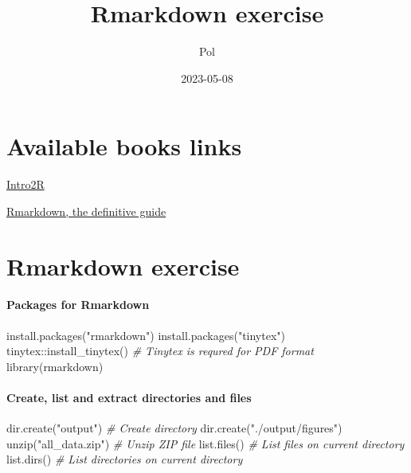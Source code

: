 \documentclass[
]{article}
\title{Rmarkdown exercise}
\author{Pol}
\date{2023-05-08}
\newenvironment{Shaded}{\begin{snugshade}}{\end{snugshade}}
\newcommand{\CommentTok}[1]{\textcolor[rgb]{0.56,0.35,0.01}{\textit{#1}}}
\newcommand{\FunctionTok}[1]{\textcolor[rgb]{0.00,0.00,0.00}{#1}}
\newcommand{\NormalTok}[1]{#1}
\newcommand{\SpecialCharTok}[1]{\textcolor[rgb]{0.00,0.00,0.00}{#1}}
\newcommand{\StringTok}[1]{\textcolor[rgb]{0.31,0.60,0.02}{#1}}
\begin{document}
\maketitle

\hypertarget{available-books-links}{%
\section{Available books links}\label{available-books-links}}

\href{intro2r.com}{Intro2R}

\href{https://bookdown.org/yihui/rmarkdown/}{Rmarkdown, the definitive
guide}

\hypertarget{rmarkdown-exercise}{%
\section{Rmarkdown exercise}\label{rmarkdown-exercise}}

\hypertarget{packages-for-rmarkdown}{%
\paragraph{Packages for Rmarkdown}\label{packages-for-rmarkdown}}

\begin{Shaded}
\begin{Highlighting}[]
\FunctionTok{install.packages}\NormalTok{(}\StringTok{"rmarkdown"}\NormalTok{)}
\FunctionTok{install.packages}\NormalTok{(}\StringTok{"tinytex"}\NormalTok{)}
\NormalTok{tinytex}\SpecialCharTok{::}\FunctionTok{install\_tinytex}\NormalTok{() }\CommentTok{\# Tinytex is requred for PDF format}
\FunctionTok{library}\NormalTok{(rmarkdown)}
\end{Highlighting}
\end{Shaded}

\hypertarget{create-list-and-extract-directories-and-files}{%
\paragraph{Create, list and extract directories and
files}\label{create-list-and-extract-directories-and-files}}

\begin{Shaded}
\begin{Highlighting}[]
\FunctionTok{dir.create}\NormalTok{(}\StringTok{"output"}\NormalTok{) }\CommentTok{\# Create directory}
\FunctionTok{dir.create}\NormalTok{(}\StringTok{"./output/figures"}\NormalTok{) }
\FunctionTok{unzip}\NormalTok{(}\StringTok{"all\_data.zip"}\NormalTok{) }\CommentTok{\# Unzip ZIP file}
\FunctionTok{list.files}\NormalTok{() }\CommentTok{\# List files on current directory}
\FunctionTok{list.dirs}\NormalTok{() }\CommentTok{\# List directories on current directory}
\end{Highlighting}
\end{Shaded}
\end{document}
